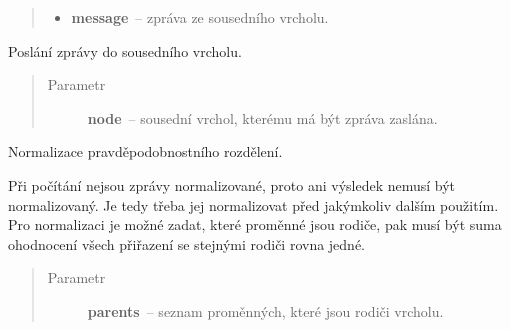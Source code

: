 \begin{fulllineitems}
\begin{fulllineitems}
\begin{quote}
\begin{description}
\begin{itemize}
\item {} 
\textbf{message}~-- zpráva ze sousedního vrcholu.

\end{itemize}

\end{description}\end{quote}

\end{fulllineitems}


\begin{fulllineitems}
\label{alex.infer:alex.infer.factor.alex.infer.node.DiscreteFactorNode.message_to}
Poslání zprávy do sousedního vrcholu.
\begin{quote}\begin{description}
\item[{Parametr}] \leavevmode
\textbf{node}~-- sousední vrchol, kterému má být zpráva zaslána.

\end{description}\end{quote}

\end{fulllineitems}


\begin{fulllineitems}
\label{alex.infer:alex.infer.factor.alex.infer.node.DiscreteFactorNode.normalize}
Normalizace pravděpodobnostního rozdělení.

Při počítání nejsou zprávy normalizované, proto ani výsledek nemusí být normalizovaný.
Je tedy třeba jej normalizovat před jakýmkoliv dalším použitím. Pro normalizaci je možné zadat, které proměnné jsou rodiče,
pak musí být suma ohodnocení všech přiřazení se stejnými rodiči rovna
jedné.
\begin{quote}\begin{description}
\item[{Parametr}] \leavevmode
\textbf{parents}~-- seznam proměnných, které jsou rodiči vrcholu.

\end{description}\end{quote}

\end{fulllineitems}


\end{fulllineitems}
